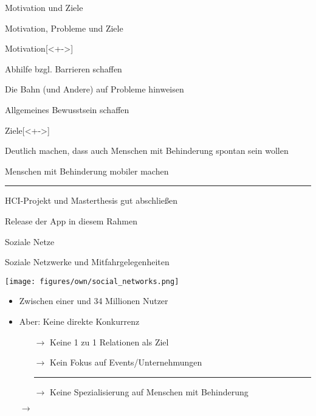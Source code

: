 

\begin{subsection}{Motivation und Ziele}
\begin{frame}{Motivation, Probleme und Ziele}

\begin{titleditems}{Motivation}[<+->]
\pause
\item Abhilfe bzgl. Barrieren schaffen
\item Die Bahn (und Andere) auf Probleme hinweisen
\item Allgemeines Bewusstsein schaffen
\end{titleditems}

\pause

\begin{titleditems}{Ziele}[<+->]
\pause
\item Deutlich machen, dass auch Menschen mit Behinderung spontan sein wollen
\item Menschen mit Behinderung mobiler machen
\noindent\rule{8cm}{0.4pt}
\item HCI-Projekt und Masterthesis gut abschließen
\item Release der App in diesem Rahmen
\end{titleditems}

\end{frame}
\end{subsection} %





\begin{subsection}{Soziale Netze}
\begin{frame}{Soziale Netzwerke und Mitfahrgelegenheiten}

\begin{2columns}[0.35] %
{\centering\texttt{[image: figures/own/social\_networks.png]}}
{ 
\pause
\begin{itemize}
	\item Zwischen einer und 34 Millionen Nutzer \cite{statista:2014}
	\pause
	\item Aber: Keine direkte Konkurrenz
	\pause
	\begin{itemize}
	  \item[$\rightarrow$] Keine 1 zu 1 Relationen als Ziel
	  \item[$\rightarrow$] Kein Fokus auf Events/Unternehmungen
	  \noindent\rule{4cm}{0.4pt}
	  \pause
	  \item[$\rightarrow$] Keine Spezialisierung auf Menschen mit Behinderung
	\end{itemize} 
	\pause
	 $\rightarrow$ 
\end{itemize}
 }
 
\end{2columns}

\end{frame}
\end{subsection} %


